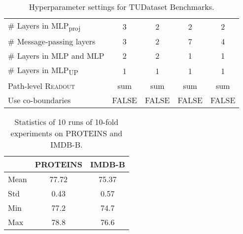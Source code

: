 \documentclass[letterpaper]{article} \usepackage{aaai24}  \usepackage{times}  \usepackage{helvet}  \usepackage{courier}  \usepackage[hyphens]{url}  \usepackage{graphicx} \urlstyle{rm} \def\UrlFont{\rm}  \usepackage{natbib}  \usepackage{caption} \frenchspacing  \setlength{\pdfpagewidth}{8.5in} \setlength{\pdfpageheight}{11in} \usepackage{algorithm}
\begin{document}
\begin{table}
{\begin{tabular}{@{}lcccc@{}}
\# Layers in MLP\textsubscript{proj}                                                  & 3                        & 2                        & 2                        & 2                        \\
\# Message-passing layers                                                           & 3                        & 2                        & 7                        & 4                        \\
\# Layers in MLP\textsubscript{} and MLP\textsubscript{} & 2                        & 2                        & 1                        & 1                        \\
\# Layers in MLP\textsubscript{UP}                                                  & 1                        & 1                        & 1                        & 1                        \\
Path-level \textsc{Readout}                                                        & sum                      & sum                      & sum                      & sum                      \\
Use co-boundaries                                                                  & FALSE                    & FALSE                    & FALSE                    & FALSE                    \\ \bottomrule
\end{tabular}}
\caption{Hyperparameter settings for TUDataset Benchmarks.}
\label{tab:tu-params}
\end{table}
\begin{table}[t]
\centering
\begin{tabular}{@{}lcc@{}}
\toprule
     & \multicolumn{1}{l}{PROTEINS} & \multicolumn{1}{l}{IMDB-B} \\ \midrule
Mean & 77.72                        & 75.37                      \\
Std  & 0.43                         & 0.57                       \\
Min  & 77.2                         & 74.7                       \\
Max  & 78.8                         & 76.6                       \\ \bottomrule
\end{tabular}\caption{Statistics of 10 runs of 10-fold experiments on PROTEINS and IMDB-B.}
\label{tab:proteins-imdbb}
\end{table}
\end{document}
